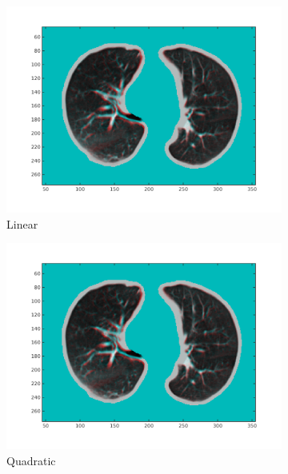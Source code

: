 \documentclass[11pt,a4paper,oneside]{report}
\begin{document}
\begin{figure}[H]
  \centering
  \hspace*{-2em}
  \begin{subfigure}[b]{0.33\textwidth}
    \includegraphics[width=\textwidth, trim=0 50 0 0,clip=true]{figures/task4/visAss_m1.png}
    \caption{Linear}
  \end{subfigure}%
  \begin{subfigure}[b]{0.33\textwidth}
    \includegraphics[width=\textwidth, trim=0 50 0 0,clip=true]{figures/task4/visAss_m1.png}
    \caption{Quadratic}
  \end{subfigure}
  \begin{subfigure}[b]{0.33\textwidth}

\end{subfigure}
\end{figure}
\end{document}
